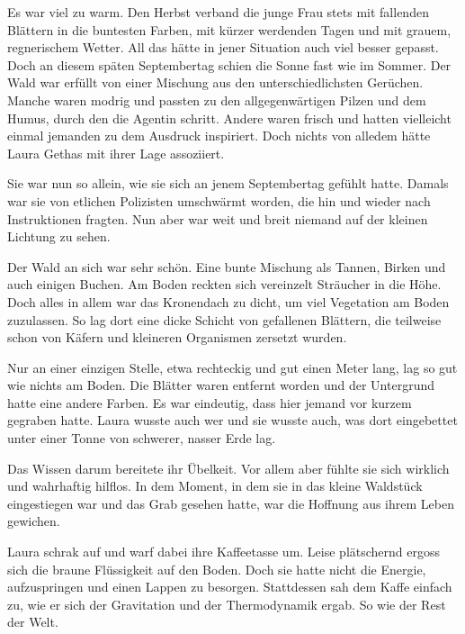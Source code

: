 Es war viel zu warm. Den Herbst verband die junge Frau stets mit fallenden Blättern in die buntesten Farben, mit kürzer werdenden Tagen und mit grauem, regnerischem Wetter. All das hätte in jener Situation auch viel besser gepasst. Doch an diesem späten Septembertag schien die Sonne fast wie im Sommer. Der Wald war erfüllt von einer Mischung aus den unterschiedlichsten Gerüchen. Manche waren modrig und passten zu den allgegenwärtigen Pilzen und dem Humus, durch den die Agentin schritt. Andere waren frisch und hatten vielleicht einmal jemanden zu dem Ausdruck  inspiriert. Doch nichts von alledem hätte Laura Gethas mit ihrer Lage assoziiert.

\par

Sie war nun so allein, wie sie sich an jenem Septembertag gefühlt hatte. Damals war sie von etlichen Polizisten umschwärmt worden, die hin und wieder nach Instruktionen fragten. Nun aber war weit und breit niemand auf der kleinen Lichtung zu sehen.

\par

Der Wald an sich war sehr schön. Eine bunte Mischung als Tannen, Birken und auch einigen Buchen. Am Boden reckten sich vereinzelt Sträucher in die Höhe. Doch alles in allem war das Kronendach zu dicht, um viel Vegetation am Boden zuzulassen. So lag dort eine dicke Schicht von gefallenen Blättern, die teilweise schon von Käfern und kleineren Organismen zersetzt wurden.

\par

Nur an einer einzigen Stelle, etwa rechteckig und gut einen Meter lang, lag so gut wie nichts am Boden. Die Blätter waren entfernt worden und der Untergrund hatte eine andere Farben. Es war eindeutig, dass hier jemand vor kurzem gegraben hatte. Laura wusste auch wer und sie wusste auch, was dort eingebettet unter einer Tonne von schwerer, nasser Erde lag.

\par

Das Wissen darum bereitete ihr Übelkeit. Vor allem aber fühlte sie sich wirklich und wahrhaftig hilflos. In dem Moment, in dem sie in das kleine Waldstück eingestiegen war und das Grab gesehen hatte, war die Hoffnung aus ihrem Leben gewichen.

\par

Laura schrak auf und warf dabei ihre Kaffeetasse um. Leise plätschernd ergoss sich die braune Flüssigkeit auf den Boden. Doch sie hatte nicht die Energie, aufzuspringen und einen Lappen zu besorgen. Stattdessen sah dem Kaffe einfach zu, wie er sich der Gravitation und der Thermodynamik ergab. So wie der Rest der Welt.

